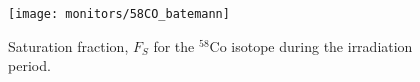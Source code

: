 \begin{figure}[htb]
\texttt{[image: monitors/58CO\_batemann]}
\caption{Saturation fraction, $F_S$ for the $^{58}$Co isotope during the irradiation period.
}
\label{fig:58CO_batemann}
\end{figure}